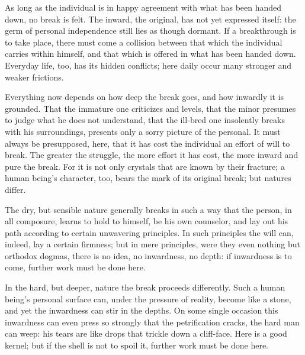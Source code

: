 \documentclass[12pt,a4paper]{book}
\begin{document}
As long as the individual is in happy agreement with what has been handed down, no break is felt. The inward, the original, has not yet expressed itself: the germ of personal independence still lies as though dormant. If a breakthrough is to take place, there must come a collision between that which the individual carries within himself, and that which is offered in what has been handed down. Everyday life, too, has its hidden
conflicts; here daily occur many stronger and weaker frictions.

Everything now depends on how deep the break goes, and how inwardly it is grounded. That the immature one criticizes and levels, that the minor presumes to judge what he does not understand, that the ill-bred one insolently breaks with his surroundings, presents only a sorry picture of the personal. It must always be presupposed, here, that it has cost the individual an effort of will to break. The greater the struggle, the more effort it has cost, the more inward and pure the break. For it is not only crystals that are known by their fracture; a human being's character, too, bears the mark of its original break; but natures differ.

The dry, but sensible nature generally breaks in such a way that the person, in all composure, learns to hold to himself, be his own counselor, and lay out his path according to certain unwavering principles. In such principles the will can, indeed, lay a certain firmness; but in mere principles, were they even nothing but orthodox dogmas, there is no idea, no inwardness, no depth: if inwardness is to come, further work must be done here.

In the hard, but deeper, nature the break proceeds differently. Such a human being's personal surface can, under the pressure of reality, become like a stone, and yet the inwardness can stir in the depths. On some single occasion this inwardness can even press so strongly that the petrification cracks, the hard man can weep: his tears are like drops that trickle down a cliff-face. Here is a good kernel; but if the shell is not to spoil it, further work must be done here.
\end{document}
